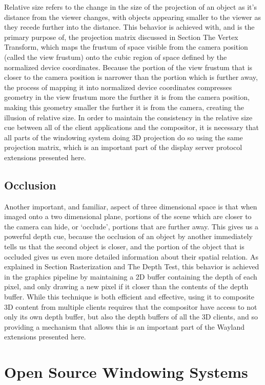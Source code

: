 Relative size refers to the change in the size of the projection of an object as it's distance from the viewer changes, with objects appearing smaller to the viewer as they recede further into the distance. This behavior is achieved with, and is the primary purpose of, the projection matrix discussed in Section {The Vertex Transform}, which maps the frustum of space visible from the camera position (called the view frustum) onto the cubic region of space defined by the normalized device coordinates. Because the portion of the view frustum that is closer to the camera position is narrower than the portion which is further away, the process of mapping it into normalized device coordinates compresses geometry in the view frustum more the further it is from the camera position, making this geometry smaller the further it is from the camera, creating the illusion of relative size. In order to maintain the consistency in the relative size cue between all of the client applications and the compositor, it is necessary that all parts of the windowing system doing 3D projection do so using the same projection matrix, which is an important part of the display server protocol extensions presented here.

\subsection{Occlusion}

Another important, and familiar, aspect of three dimensional space is that when imaged onto a two dimensional plane, portions of the scene which are closer to the camera can hide, or ‘occlude', portions that are further away. This gives us a powerful depth cue, because the occlusion of an object by another immediately tells us that the second object is closer, and the portion of the object that is occluded gives us even more detailed information about their spatial relation. As explained in Section {Rasterization and The Depth Test}, this behavior is achieved in the graphics pipeline by maintaining a 2D buffer containing the depth of each pixel, and only drawing a new pixel if it closer than the contents of the depth buffer. While this technique is both efficient and effective, using it to composite 3D content from multiple clients requires that the compositor have access to not only its own depth buffer, but also the depth buffers of all the 3D clients, and so providing a mechanism that allows this is an important part of the Wayland extensions presented here. 

\section{Open Source Windowing Systems}

